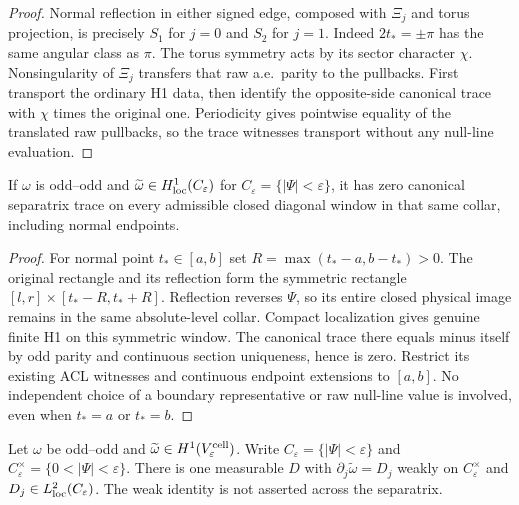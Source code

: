 \begin{proof}
\leanok
Normal reflection in either signed edge, composed with $\Xi_j$ and torus
projection, is precisely $S_1$ for $j=0$ and $S_2$ for $j=1$.
Indeed $2t_*=\pm\pi$ has the same angular class as $\pi$.
The torus symmetry acts by its sector character $\chi$.
Nonsingularity of $\Xi_j$ transfers that raw a.e.\ parity to the pullbacks.
First transport the ordinary H1 data, then identify the opposite-side
canonical trace with $\chi$ times the original one.
Periodicity gives pointwise equality of the translated raw pullbacks,
so the trace witnesses transport without any null-line evaluation.
\end{proof}

\begin{lemma}
\label{lem:odd-odd-collar-zero-traces}
\leanok
If $\omega$ is odd--odd and
$\widetilde\omega\in H^1_{\rm loc}(C_\varepsilon)$ for
$C_\varepsilon=\{|\Psi|<\varepsilon\}$, it has zero canonical separatrix
trace on every admissible closed diagonal window in that same collar,
including normal endpoints.
\end{lemma}

\begin{proof}
\leanok
For normal point $t_*\in[a,b]$ set
$R=\max(t_*-a,b-t_*)>0$.
The original rectangle and its reflection form the symmetric rectangle
$[l,r]\times[t_*-R,t_*+R]$. Reflection reverses $\Psi$, so its entire
closed physical image remains in the same absolute-level collar.
Compact localization gives genuine finite H1 on this symmetric window.
The canonical trace there equals minus itself by odd parity and continuous
section uniqueness, hence is zero. Restrict its existing ACL witnesses and
continuous endpoint extensions to $[a,b]$.
No independent choice of a boundary representative or raw null-line value
is involved, even when $t_*=a$ or $t_*=b$.
\end{proof}

\begin{lemma}
\label{lem:odd-odd-collar-gradient}
\leanok
Let $\omega$ be odd--odd and
$\widetilde\omega\in H^1(V_\varepsilon^{\rm cell})$.
Write $C_\varepsilon=\{|\Psi|<\varepsilon\}$ and
$C_\varepsilon^\times=\{0<|\Psi|<\varepsilon\}$.
There is one measurable $D$ with
$\partial_j\widetilde\omega=D_j$ weakly on $C_\varepsilon^\times$
and $D_j\in L^2_{\rm loc}(C_\varepsilon)$.
The weak identity is not asserted across the separatrix.
\end{lemma}

